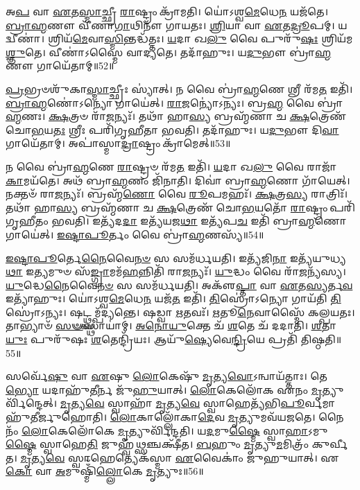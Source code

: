 𑌅\-\ul{𑌪} 𑌵𑌾 \ul{𑌏}\-𑌤\-\ul{𑌸𑍍𑌮𑌾}\-𑌚𑍍𑌛𑍍𑌰𑍀 \ul{𑌰𑌾}\-𑌷𑍍𑌟𑍍𑌰𑌂 𑌕𑍍𑌰𑌾᳴𑌮𑌤𑌿।
𑌯𑍋॑𑌽𑌶𑍍𑌵\-\ul{𑌮𑍇}\-𑌧𑍇\-\ul{𑌨} 𑌯𑌜᳴𑌤𑍇।
\-\ul{𑌬𑍍𑌰𑌾}\-\-\ul{𑌹𑍍𑌮}\-𑌣𑍗 𑌵𑍀᳴𑌣𑌾\-\ul{𑌗𑌾}\-𑌥𑌿𑌨𑍗᳴ 𑌗𑌾𑌯𑌤𑌃।
\-\ul{𑌶𑍍𑌰𑌿}\-𑌯𑌾 𑌵𑌾 \ul{𑌏}\-𑌤\-\ul{𑌦𑍍𑌰𑍂}\-𑌪𑌮𑍍।
𑌯𑌦𑍍𑌵𑍀𑌣𑌾॑।
𑌶𑍍𑌰𑌿𑌯᳴\-\ul{𑌮𑍇}\-𑌵𑌾\-\ul{𑌸𑍍𑌮𑌿}\-𑌨𑍍𑌤𑌦𑍍𑌧᳴𑌤𑍍𑌤𑌃।
\-\ul{𑌯}\-𑌦𑌾 𑌖\-\ul{𑌲𑍁} 𑌵𑍈 𑌪𑍁𑌰𑍁᳴\-\ul{𑌷𑌃} 𑌶𑍍𑌰𑌿𑌯᳴𑌮\-\ul{𑌶𑍍𑌞𑍁}\-𑌤𑍇।
𑌵𑍀𑌣𑌾॑\-𑌽𑌸𑍍𑌮𑍈 𑌵𑌾𑌦𑍍𑌯𑌤𑍇।
𑌤𑌦𑌾᳴𑌹𑍁𑌃।
𑌯\-\ul{𑌦𑍁}\-𑌭𑍗 𑌬𑍍𑌰𑌾॑\-\ul{𑌹𑍍𑌮}\-𑌣𑍗 𑌗𑌾𑌯𑍇᳴𑌤𑌾𑌮𑍍॥52॥

\-\ul{𑌪𑍍𑌰}\-𑌭𑍍𑌰𑍞𑌶𑍁᳴𑌕𑌾\-\ul{𑌸𑍍𑌮𑌾}\-𑌚𑍍𑌛𑍍𑌰𑍀𑌃 𑌸𑍍𑌯𑌾॑𑌤𑍍।
𑌨 𑌵𑍈 𑌬𑍍𑌰𑌾॑\-\ul{𑌹𑍍𑌮}\-𑌣𑍇 𑌶𑍍𑌰𑍀 𑌰᳴𑌮\-\ul{𑌤} 𑌇𑌤𑌿᳴।
\-\ul{𑌬𑍍𑌰𑌾}\-\-\ul{𑌹𑍍𑌮}\-𑌣𑍋॑\-𑌽𑌨𑍍𑌯𑍋 𑌗𑌾𑌯𑍇॑𑌤𑍍।
\-\ul{𑌰𑌾}\-\-\ul{𑌜}\-𑌨𑍍𑌯𑍋॑\-𑌽𑌨𑍍𑌯𑌃।
𑌬𑍍𑌰\-\ul{𑌹𑍍𑌮} 𑌵𑍈 𑌬𑍍𑌰𑌾॑\-\ul{𑌹𑍍𑌮}\-𑌣𑌃।
\-\ul{𑌕𑍍𑌷}\-𑌤𑍍𑌰𑍞 𑌰𑌾᳴\-\ul{𑌜}\-𑌨𑍍𑌯𑌃᳴।
𑌤𑌥𑌾᳴ 𑌹𑌾\-\ul{𑌸𑍍𑌯} 𑌬𑍍𑌰𑌹𑍍𑌮᳴𑌣𑌾 𑌚 \ul{𑌕𑍍𑌷}\-𑌤𑍍𑌰𑍇𑌣᳴ 𑌚𑍋\-\ul{𑌭}\-𑌯\-\ul{𑌤𑌃} 𑌶𑍍𑌰𑍀𑌃 𑌪𑌰𑌿᳴𑌗𑍃𑌹𑍀𑌤𑌾 𑌭𑌵𑌤𑌿।
𑌤𑌦𑌾᳴𑌹𑍁𑌃।
𑌯\-\ul{𑌦𑍁}\-𑌭𑍗 𑌦𑌿\-\ul{𑌵𑌾} 𑌗𑌾𑌯𑍇᳴𑌤𑌾𑌮𑍍।
𑌅𑌪𑌾॑𑌸𑍍𑌮𑌾\-\ul{𑌦𑍍𑌰𑌾}\-𑌷𑍍𑌟𑍍𑌰𑌂 𑌕𑍍𑌰𑌾᳴𑌮𑍇𑌤𑍍॥53॥

𑌨 𑌵𑍈 𑌬𑍍𑌰𑌾॑\-\ul{𑌹𑍍𑌮}\-𑌣𑍇 \ul{𑌰𑌾}\-𑌷𑍍𑌟𑍍𑌰𑍞 𑌰᳴𑌮\-\ul{𑌤} 𑌇𑌤𑌿᳴।
\-\ul{𑌯}\-𑌦𑌾 𑌖\-\ul{𑌲𑍁} 𑌵𑍈 𑌰𑌾𑌜𑌾᳴ \ul{𑌕𑌾}\-𑌮𑌯᳴𑌤𑍇।
𑌅𑌥᳴ 𑌬𑍍𑌰𑌾\-\ul{𑌹𑍍𑌮}\-𑌣𑌂 𑌜𑌿᳴𑌨𑌾𑌤𑌿।
𑌦𑌿𑌵𑌾॑ 𑌬𑍍𑌰𑌾\-\ul{𑌹𑍍𑌮}\-𑌣𑍋 𑌗𑌾᳴𑌯𑍇𑌤𑍍।
𑌨𑌕𑍍𑌤𑍞᳴ 𑌰𑌾\-\ul{𑌜}\-𑌨𑍍𑌯𑌃᳴।
𑌬𑍍𑌰𑌹𑍍𑌮᳴\-\ul{𑌣𑍋} 𑌵𑍈 \ul{𑌰𑍂}\-𑌪𑌮𑌹𑌃᳴।
\-\ul{𑌕𑍍𑌷}\-𑌤𑍍𑌰\-\ul{𑌸𑍍𑌯} 𑌰𑌾𑌤𑍍𑌰𑌿𑌃᳴।
𑌤𑌥𑌾᳴ 𑌹𑌾\-\ul{𑌸𑍍𑌯} 𑌬𑍍𑌰𑌹𑍍𑌮᳴𑌣𑌾 𑌚 \ul{𑌕𑍍𑌷}\-𑌤𑍍𑌰𑍇𑌣᳴ 𑌚𑍋\-\ul{𑌭}\-𑌯𑌤𑍋᳴ \ul{𑌰𑌾}\-𑌷𑍍𑌟𑍍𑌰𑌂 𑌪𑌰𑌿᳴𑌗𑍃𑌹𑍀𑌤𑌂 𑌭𑌵𑌤𑌿।
𑌇𑌤𑍍𑌯᳴𑌦\-\ul{𑌦𑌾} 𑌇𑌤𑍍𑌯᳴𑌯𑌜\-\ul{𑌥𑌾} 𑌇𑌤𑍍𑌯᳴𑌪\-\ul{𑌚} 𑌇𑌤𑌿᳴ 𑌬𑍍𑌰𑌾\-\ul{𑌹𑍍𑌮}\-𑌣𑍋 𑌗𑌾𑌯𑍇॑𑌤𑍍।
\-\ul{𑌇}\-\-\ul{𑌷𑍍𑌟𑌾}\-\-\ul{𑌪𑍂}\-𑌰𑍍𑌤𑌂 𑌵𑍈 𑌬𑍍𑌰𑌾॑\-\ul{𑌹𑍍𑌮}\-𑌣𑌸𑍍𑌯᳴॥54॥

\-\ul{𑌇}\-\-\ul{𑌷𑍍𑌟𑌾}\-\-\ul{𑌪𑍂}\-𑌰𑍍𑌤𑍇\-\ul{𑌨𑍈}\-𑌵𑍈\-\ul{𑌨}\-\-\ul{𑍞} 𑌸 𑌸𑌮᳴𑌰𑍍𑌧𑌯𑌤𑌿।
𑌇𑌤𑍍𑌯᳴𑌜𑌿\-\ul{𑌨𑌾} 𑌇𑌤𑍍𑌯᳴𑌯𑍁𑌧𑍍𑌯\-\ul{𑌥𑌾} 𑌇\-\ul{𑌤𑍍𑌯}\-𑌮𑍁𑍞 𑌸᳴\-\ul{𑌙𑍍𑌗𑍍𑌰𑌾}\-𑌮𑌮᳴\-\ul{𑌹}\-𑌨𑍍𑌨𑌿𑌤𑌿᳴ 𑌰𑌾\-\ul{𑌜}\-𑌨𑍍𑌯𑌃᳴।
\-\ul{𑌯𑍁}\-𑌦𑍍𑌧𑌂 𑌵𑍈 𑌰𑌾᳴\-\ul{𑌜}\-𑌨𑍍𑌯᳴𑌸𑍍𑌯।
\-\ul{𑌯𑍁}\-𑌦𑍍𑌧𑍇\-\ul{𑌨𑍈}\-𑌵𑍈\-\ul{𑌨}\-\-\ul{𑍞} 𑌸 𑌸𑌮᳴𑌰𑍍𑌧𑌯𑌤𑌿।
𑌅𑌕𑍢᳴\-\ul{𑌪𑍍𑌤𑌾} 𑌵𑌾 \ul{𑌏}\-𑌤\-\ul{𑌸𑍍𑌯}\-𑌰𑍍𑌤\-\ul{𑌵} 𑌇𑌤𑍍𑌯𑌾᳴𑌹𑍁𑌃।
𑌯𑍋॑𑌽𑌶𑍍𑌵\-\ul{𑌮𑍇}\-𑌧𑍇\-\ul{𑌨} 𑌯𑌜᳴\-\ul{𑌤} 𑌇𑌤𑌿᳴।
\-\ul{𑌤𑌿}\-𑌸𑍍𑌰𑍋॑\-𑌽𑌨𑍍𑌯𑍋 𑌗𑌾𑌯᳴𑌤𑌿 \ul{𑌤𑌿}\-𑌸𑍍𑌰𑍋॑\-𑌽𑌨𑍍𑌯𑌃।
𑌷𑌟𑍍𑌥𑍍𑌸𑌮𑍍𑌪᳴𑌦𑍍𑌯𑌨𑍍𑌤𑍇।
𑌷𑌡𑍍𑌵𑌾 \ul{𑌋}\-𑌤𑌵𑌃᳴।
\-\ul{𑌋}\-𑌤𑍂\-\ul{𑌨𑍇}\-𑌵𑌾𑌸𑍍𑌮𑍈᳴ 𑌕𑌲𑍍𑌪𑌯𑌤𑌃।
𑌤𑌾𑌭𑍍𑌯𑌾𑍞᳴ \ul{𑌸}\-\-\ul{𑍟}\-𑌸𑍍𑌥𑌾𑌯𑌾॑𑌮𑍍।
\-\ul{𑌅}\-\-\ul{𑌨𑍋}\-\-\ul{𑌯𑍁}\-𑌕𑍍𑌤𑍇 𑌚᳴ \ul{𑌶}\-𑌤𑍇 𑌚᳴ 𑌦𑌦𑌾𑌤𑌿।
\-\ul{𑌶}\-𑌤𑌾\-\ul{𑌯𑍁𑌃} 𑌪𑍁𑌰𑍁᳴𑌷𑌃 \ul{𑌶}\-𑌤𑍇𑌨𑍍𑌦𑍍𑌰𑌿᳴𑌯𑌃।
𑌆𑌯𑍁᳴\-\ul{𑌷𑍍𑌯𑍇}\-𑌵𑍇\-\ul{𑌨𑍍𑌦𑍍𑌰𑌿}\-𑌯𑍇 𑌪𑍍𑌰𑌤𑌿᳴ 𑌤𑌿𑌷𑍍𑌠𑌤𑌿॥55॥\anuvakamend[𑌗𑌾𑌯𑍇᳴𑌤𑌾𑌙𑍍𑌕𑍍𑌰𑌾𑌮𑍇𑌦𑍍𑌬𑍍𑌰𑌾\-\ul{𑌹𑍍𑌮}\-𑌣𑌸𑍍𑌯᳴ 𑌕𑌲𑍍𑌪𑌯𑌤\-\ul{𑌶𑍍𑌚}\-𑌤𑍍𑌵𑌾𑌰𑌿᳴ 𑌚]

𑌸𑌰𑍍𑌵𑍇᳴\-\ul{𑌷𑍁} 𑌵𑌾 \ul{𑌏}\-𑌷𑍁 \ul{𑌲𑍋}\-𑌕𑍇𑌷𑍁᳴ \ul{𑌮𑍃}\-𑌤𑍍𑌯\-\ul{𑌵𑍋}\-\-𑌽𑌨𑍍𑌵𑌾𑌯᳴𑌤𑍍𑌤𑌾𑌃।
𑌤𑍇\-\ul{𑌭𑍍𑌯𑍋} 𑌯𑌦𑌾𑌹𑍁᳴\-\ul{𑌤𑍀}\-𑌰𑍍𑌨 𑌜𑍁᳴\-\ul{𑌹𑍁}\-𑌯𑌾𑌤𑍍।
\-\ul{𑌲𑍋}\-𑌕𑍇𑌲𑍋᳴𑌕 𑌏𑌨𑌂 \ul{𑌮𑍃}\-𑌤𑍍𑌯𑍁𑌰𑍍𑌵𑌿᳴𑌨𑍍𑌦𑍇𑌤𑍍।
\-\ul{𑌮𑍃}\-𑌤𑍍𑌯\-\ul{𑌵𑍇} 𑌸𑍍𑌵𑌾𑌹𑌾᳴ \ul{𑌮𑍃}\-𑌤𑍍𑌯\-\ul{𑌵𑍇} 𑌸𑍍𑌵𑌾𑌹𑍇𑌤𑍍𑌯᳴𑌭𑌿\-\ul{𑌪𑍂}\-𑌰𑍍𑌵𑌮𑌾𑌹𑍁᳴𑌤𑍀𑌰𑍍𑌜𑍁𑌹𑍋𑌤𑌿।
\-\ul{𑌲𑍋}\-𑌕𑌾𑌲𑍍𑌲𑍋᳴𑌕𑌾\-\ul{𑌦𑍇}\-𑌵 \ul{𑌮𑍃}\-𑌤𑍍𑌯𑍁𑌮𑌵᳴𑌯𑌜𑌤𑍇।
𑌨𑍈𑌨𑌂᳴ \ul{𑌲𑍋}\-𑌕𑍇𑌲𑍋᳴𑌕𑍇 \ul{𑌮𑍃}\-𑌤𑍍𑌯𑍁𑌰𑍍𑌵𑌿᳴𑌨𑍍𑌦𑌤𑌿।
𑌯\-\ul{𑌦}\-𑌮𑍁\-\ul{𑌷𑍍𑌮𑍈} 𑌸𑍍𑌵𑌾\-\ul{𑌹𑌾}\-\-𑌽𑌮𑍁\-\ul{𑌷𑍍𑌮𑍈} 𑌸𑍍𑌵𑌾𑌹𑍇\-\ul{𑌤𑌿} 𑌜𑍁𑌹𑍍𑌵᳴\-\ul{𑌥𑍍𑌸}\-𑌞𑍍𑌚𑌕𑍍𑌷𑍀᳴𑌤।
\-\ul{𑌬}\-𑌹𑍁𑌂 \ul{𑌮𑍃}\-𑌤𑍍𑌯𑍁\-\ul{𑌮}\-𑌮𑌿𑌤𑍍𑌰𑌂᳴ 𑌕𑍁𑌰𑍍𑌵𑍀𑌤।
\-\ul{𑌮𑍃}\-𑌤𑍍𑌯\-\ul{𑌵𑍇} 𑌸𑍍𑌵𑌾𑌹𑍇𑌤𑍍𑌯𑍇𑌕᳴𑌸𑍍𑌮𑌾 \ul{𑌏}\-𑌵𑍈𑌕𑌾𑌂॑ 𑌜𑍁𑌹𑍁𑌯𑌾𑌤𑍍।
𑌏\-\ul{𑌕𑍋} 𑌵𑌾 \ul{𑌅}\-𑌮𑍁𑌷𑍍𑌮𑌿𑌁᳴\-\ul{𑌲𑍍𑌲𑍋}\-𑌕𑍇 \ul{𑌮𑍃}\-𑌤𑍍𑌯𑍁𑌃॥56॥

